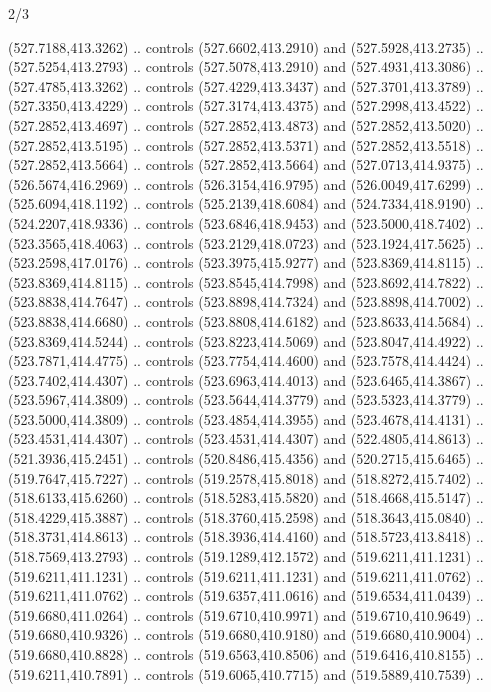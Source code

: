 \begin{flagdescription}{2/3}
\begin{scope}[xshift=0.5\flaglength,yshift=0.5\flagwidth,scale=\flagwidth/495.65]
\begin{scope}[y=0.8pt, x=0.8pt, yscale=-1,shift={(-463.76,-309.78)}]
  (527.7188,413.3262) .. controls (527.6602,413.2910) and (527.5928,413.2735) ..
  (527.5254,413.2793) .. controls (527.5078,413.2910) and (527.4931,413.3086) ..
  (527.4785,413.3262) .. controls (527.4229,413.3437) and (527.3701,413.3789) ..
  (527.3350,413.4229) .. controls (527.3174,413.4375) and (527.2998,413.4522) ..
  (527.2852,413.4697) .. controls (527.2852,413.4873) and (527.2852,413.5020) ..
  (527.2852,413.5195) .. controls (527.2852,413.5371) and (527.2852,413.5518) ..
  (527.2852,413.5664) .. controls (527.2852,413.5664) and (527.0713,414.9375) ..
  (526.5674,416.2969) .. controls (526.3154,416.9795) and (526.0049,417.6299) ..
  (525.6094,418.1192) .. controls (525.2139,418.6084) and (524.7334,418.9190) ..
  (524.2207,418.9336) .. controls (523.6846,418.9453) and (523.5000,418.7402) ..
  (523.3565,418.4063) .. controls (523.2129,418.0723) and (523.1924,417.5625) ..
  (523.2598,417.0176) .. controls (523.3975,415.9277) and (523.8369,414.8115) ..
  (523.8369,414.8115) .. controls (523.8545,414.7998) and (523.8692,414.7822) ..
  (523.8838,414.7647) .. controls (523.8898,414.7324) and (523.8898,414.7002) ..
  (523.8838,414.6680) .. controls (523.8808,414.6182) and (523.8633,414.5684) ..
  (523.8369,414.5244) .. controls (523.8223,414.5069) and (523.8047,414.4922) ..
  (523.7871,414.4775) .. controls (523.7754,414.4600) and (523.7578,414.4424) ..
  (523.7402,414.4307) .. controls (523.6963,414.4013) and (523.6465,414.3867) ..
  (523.5967,414.3809) .. controls (523.5644,414.3779) and (523.5323,414.3779) ..
  (523.5000,414.3809) .. controls (523.4854,414.3955) and (523.4678,414.4131) ..
  (523.4531,414.4307) .. controls (523.4531,414.4307) and (522.4805,414.8613) ..
  (521.3936,415.2451) .. controls (520.8486,415.4356) and (520.2715,415.6465) ..
  (519.7647,415.7227) .. controls (519.2578,415.8018) and (518.8272,415.7402) ..
  (518.6133,415.6260) .. controls (518.5283,415.5820) and (518.4668,415.5147) ..
  (518.4229,415.3887) .. controls (518.3760,415.2598) and (518.3643,415.0840) ..
  (518.3731,414.8613) .. controls (518.3936,414.4160) and (518.5723,413.8418) ..
  (518.7569,413.2793) .. controls (519.1289,412.1572) and (519.6211,411.1231) ..
  (519.6211,411.1231) .. controls (519.6211,411.1231) and (519.6211,411.0762) ..
  (519.6211,411.0762) .. controls (519.6357,411.0616) and (519.6534,411.0439) ..
  (519.6680,411.0264) .. controls (519.6710,410.9971) and (519.6710,410.9649) ..
  (519.6680,410.9326) .. controls (519.6680,410.9180) and (519.6680,410.9004) ..
  (519.6680,410.8828) .. controls (519.6563,410.8506) and (519.6416,410.8155) ..
  (519.6211,410.7891) .. controls (519.6065,410.7715) and (519.5889,410.7539) ..

\end{scope}
\end{scope}
\end{flagdescription}
